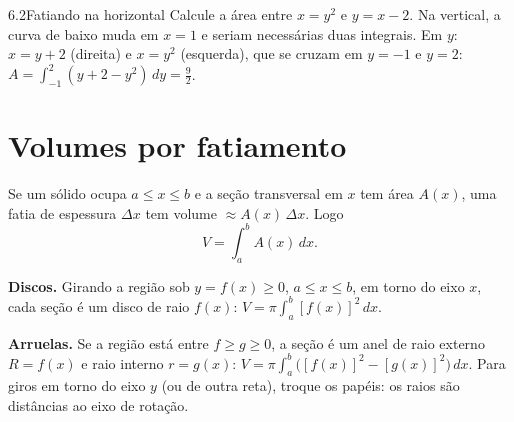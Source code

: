 \begin{exemplo}{6.2}{Fatiando na horizontal}
Calcule a área entre $x=y^2$ e $y=x-2$.
\solucao
Na vertical, a curva de baixo muda em $x=1$ e seriam necessárias duas integrais. Em $y$:
$x=y+2$ (direita) e $x=y^2$ (esquerda), que se cruzam em $y=-1$ e $y=2$:
$A=\int_{-1}^2(y+2-y^2)\,dy=\frac92$.
\end{exemplo}

\section{Volumes por fatiamento}

Se um sólido ocupa $a\le x\le b$ e a seção transversal em $x$ tem área $A(x)$, uma fatia de
espessura $\Delta x$ tem volume $\approx A(x)\,\Delta x$. Logo
\[
V=\int_a^bA(x)\,dx .
\]

\textbf{Discos.} Girando a região sob $y=f(x)\ge0$, $a\le x\le b$, em torno do eixo $x$, cada
seção é um disco de raio $f(x)$:
$V=\pi\int_a^b[f(x)]^2\,dx$.

\textbf{Arruelas.} Se a região está entre $f\ge g\ge0$, a seção é um anel de raio externo
$R=f(x)$ e raio interno $r=g(x)$:
$V=\pi\int_a^b\big([f(x)]^2-[g(x)]^2\big)\,dx$. Para giros em torno do eixo $y$ (ou de outra
reta), troque os papéis: os raios são distâncias ao eixo de rotação.


